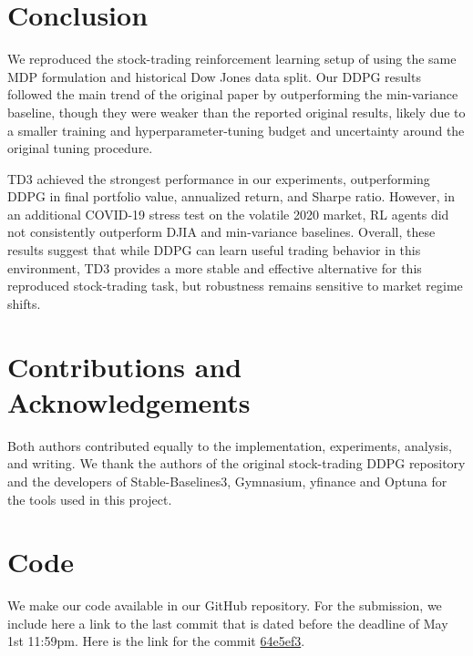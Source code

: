 \documentclass{article}
\begin{document}
\section{Conclusion}

We reproduced the stock-trading reinforcement learning setup of \cite{liu2018practical} using the same MDP formulation and historical Dow Jones data split. Our DDPG results followed the main trend of the original paper by outperforming the min-variance baseline, though they were weaker than the reported original results, likely due to a smaller training and hyperparameter-tuning budget and uncertainty around the original tuning procedure.

TD3 achieved the strongest performance in our experiments, outperforming DDPG in final portfolio value, annualized return, and Sharpe ratio. However, in an additional COVID-19 stress test on the volatile 2020 market, RL agents did not consistently outperform DJIA and min-variance baselines. Overall, these results suggest that while DDPG can learn useful trading behavior in this environment, TD3 provides a more stable and effective alternative for this reproduced stock-trading task, but robustness remains sensitive to market regime shifts.

\section*{Contributions and Acknowledgements}
Both authors contributed equally to the implementation, experiments, analysis, and writing. We thank the authors of the original stock-trading DDPG repository and the developers of Stable-Baselines3, Gymnasium, yfinance and Optuna for the tools used in this project.

\section{Code}
We make our code available in our GitHub repository. For the submission, we include here a link to the last commit that is dated before the deadline of May 1st 11:59pm. Here is the link for the commit \href{https://github.com/gkontorousis/COMP-579-Project/tree/64e5ef34394f66d59a6f273b9ea01abe5afedd4c}{64e5ef3}.





\newpage
\appendix
\end{document}
